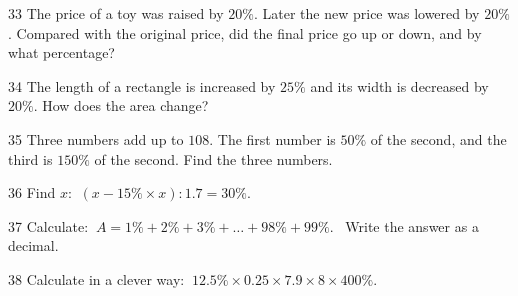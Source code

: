 \gap
\begin{probbox}{33}{}
The price of a toy was raised by $20\%$. Later the new price was lowered by $20\%$. Compared with the original price, did the final price go up or down, and by what percentage?
\end{probbox}
\gap
\begin{probbox}{34}{}
The length of a rectangle is increased by $25\%$ and its width is decreased by $20\%$. How does the area change?
\end{probbox}
\gap
\begin{probbox}{35}{}
Three numbers add up to $108$. The first number is $50\%$ of the second, and the third is $150\%$ of the second. Find the three numbers.
\end{probbox}
\gap
\begin{probbox}{36}{}
Find $x$: $\ (x-15\%\times x):1.7=30\%$.
\end{probbox}
\gap
\begin{probbox}{37}{}
Calculate: $\ A=1\%+2\%+3\%+\dots+98\%+99\%$. \ Write the answer as a decimal.
\end{probbox}
\gap
\begin{probbox}{38}{}
Calculate in a clever way: $\ 12.5\%\times0.25\times7.9\times8\times400\%$.
\end{probbox}
